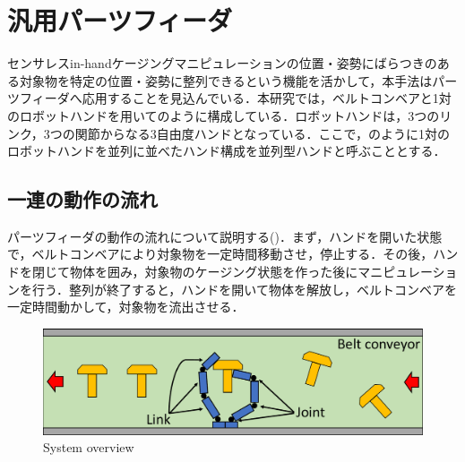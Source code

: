 \documentclass[a4paper,twoside,12pt,papersize, dvipdfmx]{iirthesis}
\begin{document}
\section{汎用パーツフィーダ}\label{sec::sicm::partsfeeder}
センサレスin-handケージングマニピュレーションの位置・姿勢にばらつきのある対象物を特定の位置・姿勢に整列できるという機能を活かして，本手法はパーツフィーダへ応用することを見込んでいる．本研究では，ベルトコンベアと1対のロボットハンドを用いてのように構成している．ロボットハンドは，3つのリンク，3つの関節からなる3自由度ハンドとなっている．ここで，のように1対のロボットハンドを並列に並べたハンド構成を並列型ハンドと呼ぶこととする．
\subsection{一連の動作の流れ\cite{kamikukita2022}}\label{subsec::sicm::flow}
パーツフィーダの動作の流れについて説明する()．まず，ハンドを開いた状態で，ベルトコンベアにより対象物を一定時間移動させ，停止する．その後，ハンドを閉じて物体を囲み，対象物のケージング状態を作った後にマニピュレーションを行う．整列が終了すると，ハンドを開いて物体を解放し，ベルトコンベアを一定時間動かして，対象物を流出させる．\par

\begin{figure}[b]
\centering
\includegraphics[width=0.9\hsize]{fig/2-sensorless-icm/systemoverview.pdf}
\caption{System overview} \label{fig::sicm::overview}
\end{figure}
\end{document}
